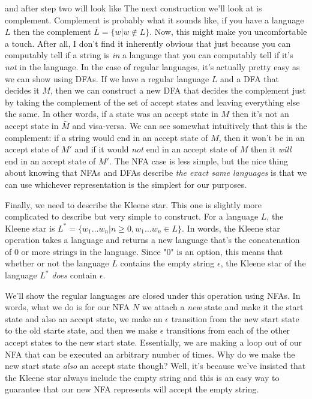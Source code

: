 \documentclass[11pt]{article}
\begin{document}
  and after step two will look like 
The next construction we'll look at is complement. Complement is probably what it sounds like, if you have a language $L$ then the complement $\bar{L} = \{ w | w \notin L\}$. Now, this might make you uncomfortable a touch. After all, I don't find it inherently obvious that just because you can computably tell if a string is \emph{in} a language that you can computably tell if it's \emph{not} in the language. In the case of regular languages, it's actually pretty easy as we can show using DFAs. If we have a regular language $L$ and a DFA that decides it $M$, then we can construct a new DFA that decides the complement just by taking the complement of the set of accept states and leaving everything else the same. In other words, if a state was an accept state in $M$ then it's not an accept state in $\bar{M}$ and visa-versa. We can see somewhat intuitively that this is the complement: if a string would end in an accept state of $M$, then it won't be in an accept state of $M'$ and if it would \emph{not} end in an accept state of $M$ then it \emph{will} end in an accept state of $M'$. The NFA case is less simple, but the nice thing about knowing that NFAs and DFAs describe \emph{the exact same languages} is that we can use whichever representation is the simplest for our purposes.

Finally, we need to describe the Kleene star. This one is slightly more complicated to describe but very simple to construct. For a language $L$, the Kleene star is $L^* = \{ w_1 \ldots w_n | n \geq 0, w_1 \ldots w_n \in L\}$. In words, the Kleene star operation takes a language and returns a new language that's the concatenation of 0 or more strings in the language. Since "0" is an option, this means that whether or not the language $L$ contains the empty string $\epsilon$, the Kleene star of the language $L^*$ \emph{does} contain $\epsilon$. 

We'll show the regular languages are closed under this operation using NFAs. In words, what we do is for our NFA $N$ we attach a \emph{new} state and make it the start state and also an accept state, we make an $\epsilon$ transition from the new start state to the old starte state, and then we make $\epsilon$ transitions from each of the other accept states to the new start state. Essentially, we are making a loop out of our NFA that can be executed an arbitrary number of times. Why do we make the new start state \emph{also} an accept state though? Well, it's because we've insisted that the Kleene star always include the empty string and this is an easy way to guarantee that our new NFA represents will accept the empty string.
\end{document}
